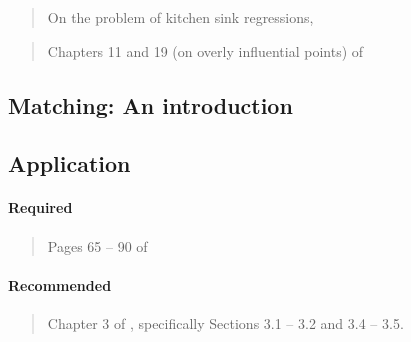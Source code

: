 \documentclass[12pt]{article}
\begin{document}
\begin{verse} On the problem of kitchen sink regressions,  \end{verse}

\begin{verse} Chapters 11 and 19 (on overly influential points) of  \end{verse}

\subsection{Matching: An introduction}

\subsection*{Application}

\begin{verse}  \end{verse}

\paragraph*{Required}

\begin{verse}
  Pages 65 -- 90 of 
\end{verse}

\begin{verse}
\end{verse}

\paragraph*{Recommended}

\begin{verse}
  Chapter 3 of , specifically Sections 3.1 -- 3.2 and 3.4 -- 3.5.
\end{verse}

\begin{verse}  \end{verse}

\begin{verse}  \end{verse}

\begin{verse}  \end{verse}
\end{document}
